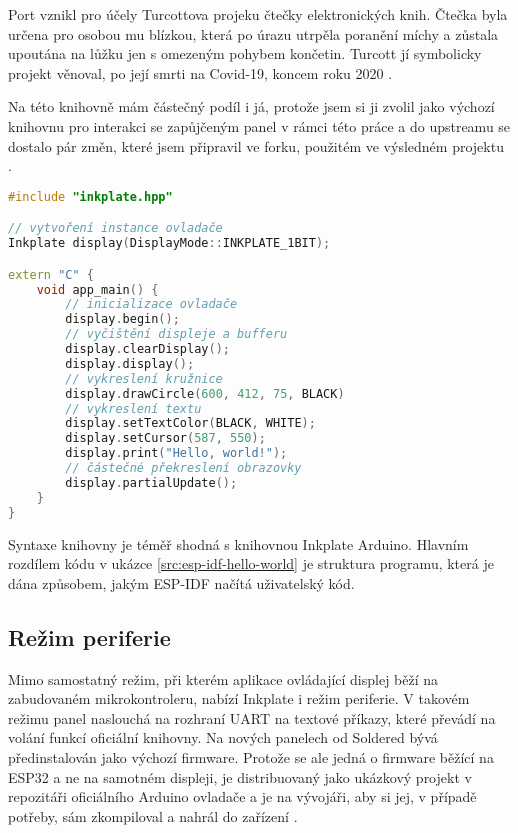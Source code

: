 Port vznikl pro účely Turcottova projeku čtečky elektronických knih. Čtečka byla určena pro osobou mu blízkou, která po úrazu utrpěla poranění míchy a zůstala upoutána na lůžku jen s omezeným pohybem končetin. Turcott jí symbolicky projekt věnoval, po její smrti na Covid-19, koncem roku 2020 \cite{turcotteTurgu1EPubInkPlate2024}.

Na této knihovně mám částečný podíl i já, protože jsem si ji zvolil jako výchozí knihovnu pro interakci se zapůjčeným panel v rámci této práce a do upstreamu se dostalo pár změn, které jsem připravil ve forku, použitém ve výsledném projektu \cite{TajnymagESPIDFInkPlateESPIDFInkPlate}.

\begin{lstlisting}[label=src:esp-idf-hello-world,language=C++,caption={Ilustrační použití knihovny Inkplate ESP-IDF}]
#include "inkplate.hpp"

// vytvoření instance ovladače
Inkplate display(DisplayMode::INKPLATE_1BIT);

extern "C" {
    void app_main() {
        // inicializace ovladače
        display.begin();
        // vyčištění displeje a bufferu
        display.clearDisplay();
        display.display();
        // vykreslení kružnice
        display.drawCircle(600, 412, 75, BLACK)
        // vykreslení textu
        display.setTextColor(BLACK, WHITE);
        display.setCursor(587, 550);
        display.print("Hello, world!");
        // částečné překreslení obrazovky
        display.partialUpdate();
    }
}
\end{lstlisting}

Syntaxe knihovny je téměř shodná s knihovnou Inkplate Arduino. Hlavním rozdílem kódu v ukázce \ref{src:esp-idf-hello-world} je struktura programu, která je dána způsobem, jakým ESP-IDF načítá uživatelský kód.

\subsection{Režim periferie}
Mimo samostatný režim, při kterém aplikace ovládající displej běží na zabudovaném mikrokontroleru, nabízí Inkplate i režim periferie. V takovém režimu panel naslouchá na rozhraní UART na textové příkazy, které převádí na volání funkcí oficiální knihovny. Na nových panelech od Soldered bývá předinstalován jako výchozí firmware. Protože se ale jedná o firmware běžící na ESP32 a ne na samotném displeji, je distribuovaný jako ukázkový projekt v repozitáři oficiálního Arduino ovladače a je na vývojáři, aby si jej, v případě potřeby, sám zkompiloval a nahrál do zařízení \cite{SolderedElectronicsInkplatePeripheralModeRaspberryPiExample2023}.

